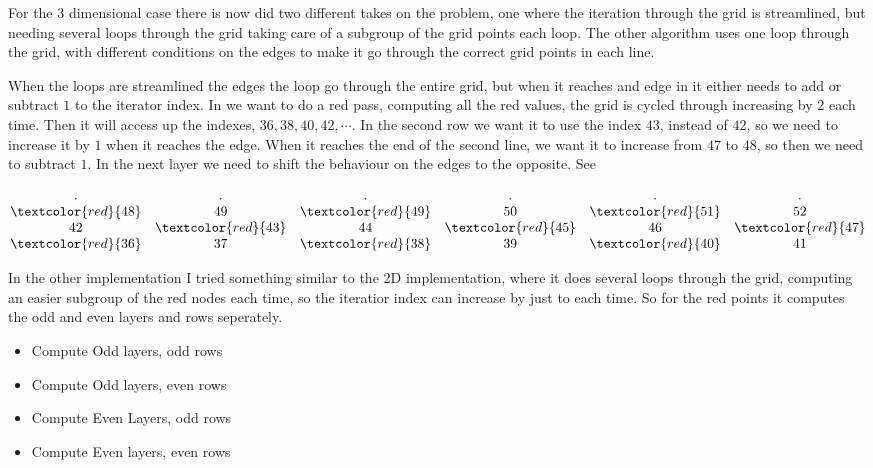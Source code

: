 	For the 3 dimensional case there is now did two different takes on the problem, one where the iteration through the grid is streamlined, but needing
	several loops through the grid taking care of a subgroup of the grid points each loop. The other algorithm uses one loop through the grid,
	with different conditions on the edges to make it go through the correct grid points in each line.

	When the loops are streamlined the edges the loop go through the entire grid, but when it reaches and edge in it either needs to add or subtract \(1\) to
	the iterator index. In \label{eq:RB_loop} we want to do a red pass, computing all the red values, the grid is cycled through increasing by 2 each time.
	Then it will access up the indexes, \(36, 38, 40,42, \cdots\). In the second row we want it to use the index \(43\), instead of \(42\), so we need to
	increase it by \(1\) when it reaches the edge. When it reaches the end of the second line, we want it to increase from \(47\) to \(48\),
	so then we need to subtract \(1\). In the next layer we need to shift the behaviour on the edges to the opposite. See

	\[
	\begin{matrix}
	.	&	.	&	. &	.	& .	& .
	\\
	\textcolor{red}{48} &49 &\textcolor{red}{49} &50 & \textcolor{red}{51} &52
	\\
	42	& \textcolor{red}{43} &44 &\textcolor{red}{45} &46 &\textcolor{red}{47}
	\\
	\textcolor{red}{36} & 37 &\textcolor{red}{38}  &39 & \textcolor{red}{40} & 41
	\end{matrix}
	\label{eq:RB-loop}
	\]

	In the other implementation I tried something similar to the 2D implementation, where it does several
	loops through the grid, computing an easier subgroup of the red nodes each time, so the iteratior index
	can increase by just to each time. So for the red points it computes the odd and even layers and rows seperately.

	\begin{itemize}
		\item Compute Odd layers, odd rows
		\item Compute Odd layers, even rows
		\item Compute Even Layers, odd rows
		\item Compute Even layers, even rows
	\end{itemize}


